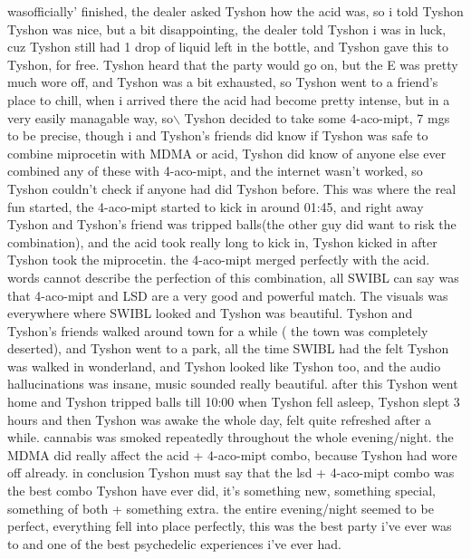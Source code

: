 \documentclass[12pt]{book}
\begin{document}
wasofficially' finished, the dealer asked Tyshon how the acid was, so i told Tyshon Tyshon was nice, but a bit disappointing, the dealer told Tyshon i was in luck, cuz Tyshon still had 1 drop of liquid left in the bottle, and Tyshon gave this to Tyshon, for free. Tyshon heard that the party would go on, but the E was pretty much wore off, and Tyshon was a bit exhausted, so Tyshon went to a friend's place to chill, when i arrived there the acid had become pretty intense, but in a very easily managable way, so$\backslash$ Tyshon decided to take some 4-aco-mipt, 7 mgs to be precise, though i and Tyshon's friends did know if Tyshon was safe to combine miprocetin with MDMA or acid, Tyshon did know of anyone else ever combined any of these with 4-aco-mipt, and the internet wasn't worked, so Tyshon couldn't check if anyone had did Tyshon before. This was where the real fun started, the 4-aco-mipt started to kick in around 01:45, and right away Tyshon and Tyshon's friend was tripped balls(the other guy did want to risk the combination), and the acid took really long to kick in, Tyshon kicked in after Tyshon took the miprocetin. the 4-aco-mipt merged perfectly with the acid. words cannot describe the perfection of this combination, all SWIBL can say was that 4-aco-mipt and LSD are a very good and powerful match. The visuals was everywhere where SWIBL looked and Tyshon was beautiful. Tyshon and Tyshon's friends walked around town for a while ( the town was completely deserted), and Tyshon went to a park, all the time SWIBL had the felt Tyshon was walked in wonderland, and Tyshon looked like Tyshon too, and the audio hallucinations was insane, music sounded really beautiful. after this Tyshon went home and Tyshon tripped balls till 10:00 when Tyshon fell asleep, Tyshon slept 3 hours and then Tyshon was awake the whole day, felt quite refreshed after a while. cannabis was smoked repeatedly throughout the whole evening/night. the MDMA did really affect the acid + 4-aco-mipt combo, because Tyshon had wore off already. in conclusion Tyshon must say that the lsd + 4-aco-mipt combo was the best combo Tyshon have ever did, it's something new, something special, something of both + something extra. the entire evening/night seemed to be perfect, everything fell into place perfectly, this was the best party i've ever was to and one of the best psychedelic experiences i've ever had.
\end{document}
